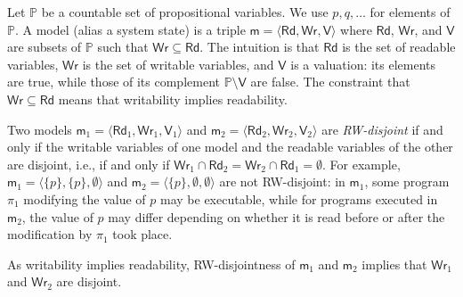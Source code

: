 \documentclass{llncs}
\newcommand{\atmset}{\mathtt{\mathbb X}}	%
\newcommand{\modl}{\mathsf m}
\newcommand{\readable}[1]{\mathtt{r}_{#1}}
\newcommand{\readset}{\mathsf{Rd}}
\newcommand{\valuset}{\mathsf{V}}
\newcommand{\writable}[1]{\mathtt{w}_{#1}}
\newcommand{\writeset}{\mathsf{Wr}}
\newcommand{\propset}{\mathbb P}
\newcommand{\set}[1]{\{#1\}}
\newcommand{\tuple}[1]{ \langle #1 \rangle}
\begin{document}
Let $\propset$ be a countable set of propositional variables. 
We use $p, q,\ldots$ for elements of $\propset$. 
A model (alias a system state) is a %
triple $\modl = \tuple{\readset,\writeset,\valuset}$ 
where $\readset$, $\writeset$, and $\valuset$ are subsets of $\propset$ such that $\writeset \subseteq \readset$. 
The intuition is that $\readset$ is the set of readable variables, $\writeset$ is the set of writable variables, and $\valuset$ is a valuation: 
its elements are true, while those of its complement $\propset \setminus \valuset$ are false. 
The constraint that $\writeset \subseteq \readset$ means that writability implies readability. 

Two models 
$\modl_1 = \tuple{\readset_1,\writeset_1,\valuset_1}$ and 
$\modl_2 = \tuple{\readset_2,\writeset_2,\valuset_2}$ are \emph{RW-disjoint} 
if and only if the writable variables of one model and the readable variables of the other are disjoint, i.e., 
if and only if $\writeset_1 \cap \readset_2  = \writeset_2 \cap \readset_1  = \emptyset $. 
For example, 
$\modl_1 = \tuple{ \set p , \set p , \emptyset}$ and 
$\modl_2 = \tuple{ \set p , \emptyset , \emptyset}$ are not RW-disjoint:
in $\modl_1$, some program $\pi_1$ modifying the value of $p$ may be executable, while 
for programs executed in $\modl_2$, the value of $p$ %
may differ depending on whether it is read 
before or after the modification by $\pi_1$ took place. 

As writability implies readability, %
RW-disjointness of $\modl_1$ and $\modl_2$ implies that
$\writeset_1$ and $\writeset_2$ are disjoint. 
\end{document}
